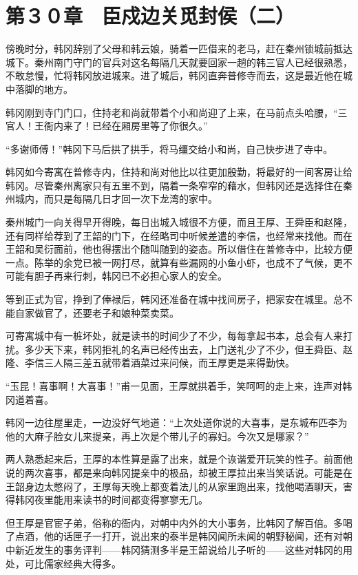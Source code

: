 \section{第３０章　臣戍边关觅封侯（二）}

傍晚时分，韩冈辞别了父母和韩云娘，骑着一匹借来的老马，赶在秦州锁城前抵达城下。秦州南门守门的官兵对这名每隔几天就要回家一趟的韩三官人已经很熟悉，不敢怠慢，忙将韩冈放进城来。进了城后，韩冈直奔普修寺而去，这是最近他在城中落脚的地方。

韩冈刚到寺门门口，住持老和尚就带着个小和尚迎了上来，在马前点头哈腰，“三官人！王衙内来了！已经在厢房里等了你很久。”

“多谢师傅！”韩冈下马后拱了拱手，将马缰交给小和尚，自己快步进了寺中。

韩冈如今寄寓在普修寺内，住持和尚对他比以往更加殷勤，将最好的一间客房让给韩冈。尽管秦州离家只有五里不到，隔着一条窄窄的藉水，但韩冈还是选择住在秦州城内，而只是每隔几日才回一次下龙湾的家中。

秦州城门一向关得早开得晚，每日出城入城很不方便，而且王厚、王舜臣和赵隆，还有同样给荐到了王韶的门下，在经略司中听候差遣的李信，也经常来找他。而在王韶和吴衍面前，他也得摆出个随叫随到的姿态。所以借住在普修寺中，比较方便一点。陈举的余党已被一网打尽，就算有些漏网的小鱼小虾，也成不了气候，更不可能有胆子再来行刺，韩冈已不必担心家人的安全。

等到正式为官，挣到了俸禄后，韩冈还准备在城中找间房子，把家安在城里。总不能自家做官了，还要老子和娘种菜卖菜。

可寄寓城中有一桩坏处，就是读书的时间少了不少，每每拿起书本，总会有人来打扰。多少天下来，韩冈拒礼的名声已经传出去，上门送礼少了不少，但王舜臣、赵隆、李信三人隔三差五就带着酒菜过来问候，而王厚更是来得勤快。

“玉昆！喜事啊！大喜事！”甫一见面，王厚就拱着手，笑呵呵的走上来，连声对韩冈道着喜。

韩冈一边往屋里走，一边没好气地道：“上次处道你说的大喜事，是东城布匹李为他的大麻子脸女儿来提亲，再上次是个带儿子的寡妇。今次又是哪家？”

两人熟悉起来后，王厚的本性算是露了出来，就是个诙谐爱开玩笑的性子。前面他说的两次喜事，都是来向韩冈提亲中的极品，却被王厚拉出来当笑话说。可能是在王韶身边太憋闷了，王厚每天晚上都变着法儿的从家里跑出来，找他喝酒聊天，害得韩冈夜里能用来读书的时间都变得寥寥无几。

但王厚是官宦子弟，俗称的衙内，对朝中内外的大小事务，比韩冈了解百倍。多喝了点酒，他的话匣子一打开，说出来的泰半是韩冈闻所未闻的朝野秘闻，还有对朝中新近发生的事务评判——韩冈猜测多半是王韶说给儿子听的——这些对韩冈的用处，可比儒家经典大得多。

